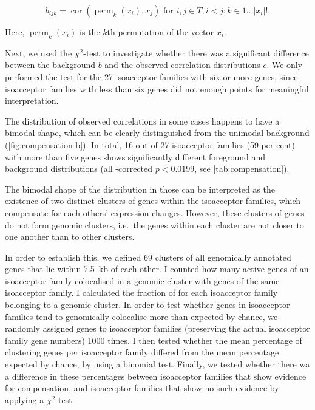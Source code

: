 \begin{equation}
    b_{ijk} = \operatorname{cor}(\operatorname{perm}_k(x_i), x_j)
        \text{\ for \(i, j \in T, i < j; k \in 1\dots\lvert x_i\rvert!\).}
\end{equation}

Here, \(\operatorname{perm}_k(x_i)\) is the \(k\)th permutation of the vector
\(x_i\).

Next, we used the \(\chi^2\)-test to investigate whether there was a significant
difference between the background \(b\) and the observed correlation
distributions \(c\). We only performed the test for the \num{27} isoacceptor
families with six or more genes, since isoacceptor families with less than six
genes did not enough points for meaningful interpretation.

The distribution of observed correlations in some cases happens to have a
bimodal shape, which can be clearly distinguished from the unimodal background
(\cref{fig:compensation-b}). In total, \num{16} out of \num{27} isoacceptor
families (\num{59} per cent) with more than five genes shows significantly
different foreground and background distributions (all \fdr-corrected \(p <
0.0199\), see \cref{tab:compensation}).

The bimodal shape of the distribution in those can be interpreted as the
existence of two distinct clusters of \trna genes within the isoacceptor
families, which compensate for each others’ expression changes. However, these
clusters of genes do not form genomic clusters, i.e.\ the \trna genes within
each cluster are not closer to one another than to other clusters.

In order to establish this, we defined \num{69} clusters of all genomically
annotated \trna genes that lie within \SI{7.5}{kb} of each other. I counted how
many active \trna genes of an isoacceptor family colocalised in a genomic
cluster with \trna genes of the same isoacceptor family. I calculated the
fraction of \trna for each isoacceptor family belonging to a genomic cluster. In
order to test whether genes in isoacceptor families tend to genomically
colocalise more than expected by chance, we randomly assigned \trna genes to
isoacceptor families (preserving the actual isoacceptor family gene numbers)
\num{1000} times. I then tested whether the mean percentage of clustering \trna
genes per isoacceptor family differed from the mean percentage expected by
chance, by using a binomial test. Finally, we tested whether there wa a
difference in these percentages between isoacceptor families that show evidence
for compensation, and isoacceptor families that show no such evidence by
applying a \(\chi^2\)-test.


